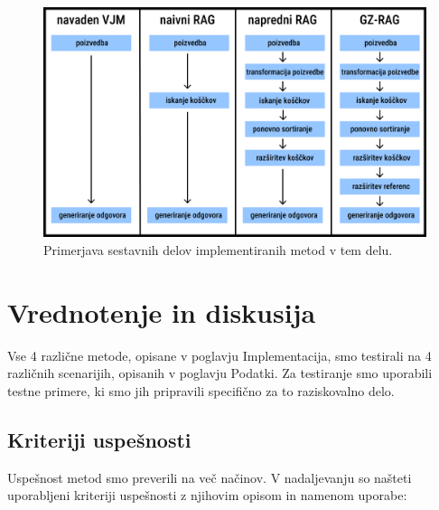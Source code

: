 \documentclass[a4paper,12pt,openright]{book}
\begin{document}
\begin{figure}[htbp]
	\centering
	\includegraphics[width=\textwidth]{rag_comparison.png}
	\caption{Primerjava sestavnih delov implementiranih metod v tem delu.}
	\label{rag_comparison}
\end{figure}

\chapter{Vrednotenje in diskusija}
\label{ch4}

Vse 4 različne metode, opisane v poglavju Implementacija, smo testirali na 4 različnih scenarijih, opisanih v poglavju Podatki. Za testiranje smo uporabili testne primere, ki smo jih pripravili specifično za to raziskovalno delo.

\section{Kriteriji uspešnosti}

Uspešnost metod smo preverili na več načinov. V nadaljevanju so našteti uporabljeni kriteriji uspešnosti z njihovim opisom in namenom uporabe:
\end{document}
